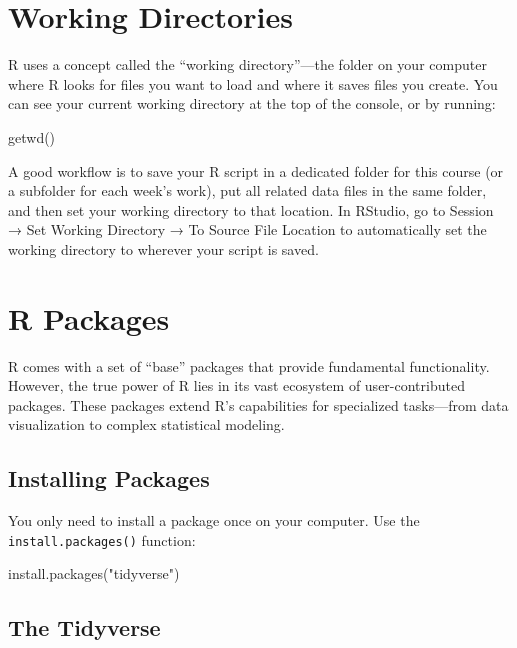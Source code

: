 \documentclass[
  letterpaper,
  DIV=11,
  numbers=noendperiod]{scrreprt}
\newenvironment{Shaded}{\begin{snugshade}}{\end{snugshade}}
\newcommand{\FunctionTok}[1]{\textcolor[rgb]{0.28,0.35,0.67}{#1}}
\newcommand{\NormalTok}[1]{\textcolor[rgb]{0.00,0.23,0.31}{#1}}
\newcommand{\StringTok}[1]{\textcolor[rgb]{0.13,0.47,0.30}{#1}}
\begin{document}
\section{Working Directories}\label{working-directories}

R uses a concept called the ``working directory''---the folder on your
computer where R looks for files you want to load and where it saves
files you create. You can see your current working directory at the top
of the console, or by running:

\begin{Shaded}
\begin{Highlighting}[]
\FunctionTok{getwd}\NormalTok{()}
\end{Highlighting}
\end{Shaded}

A good workflow is to save your R script in a dedicated folder for this
course (or a subfolder for each week's work), put all related data files
in the same folder, and then set your working directory to that
location. In RStudio, go to Session → Set Working Directory → To Source
File Location to automatically set the working directory to wherever
your script is saved.

\section{R Packages}\label{r-packages}

R comes with a set of ``base'' packages that provide fundamental
functionality. However, the true power of R lies in its vast ecosystem
of user-contributed packages. These packages extend R's capabilities for
specialized tasks---from data visualization to complex statistical
modeling.

\subsection{Installing Packages}\label{installing-packages}

You only need to install a package once on your computer. Use the
\texttt{install.packages()} function:

\begin{Shaded}
\begin{Highlighting}[]
\FunctionTok{install.packages}\NormalTok{(}\StringTok{"tidyverse"}\NormalTok{)}
\end{Highlighting}
\end{Shaded}

\subsection{The Tidyverse}\label{the-tidyverse}
\end{document}
